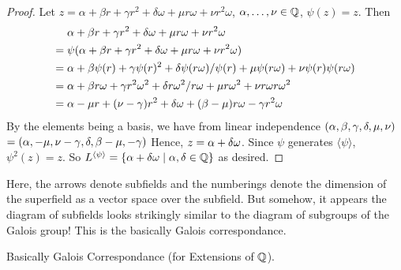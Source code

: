 \documentclass[../book.tex]{subfiles}
\begin{document}
\begin{eg}
\begin{proof}
    Let $z = \alpha + \beta r + \gamma r^2 
    + \delta \omega + \mu r\omega + \nu r^2\omega$, 
    $\alpha, \dots, \nu \in \mathbb{Q}$, $\psi (z) = z$. 
    Then \begin{align*}
        & \alpha + \beta r + \gamma r^2 
        + \delta \omega + \mu r\omega + \nu r^2\omega \\
        =\;&\psi(\alpha + \beta r + \gamma r^2 
        + \delta \omega + \mu r\omega + \nu r^2\omega) \\
        =\;& \alpha + \beta \psi(r) + \gamma \psi(r)^2 + \delta\psi(r\omega)/\psi(r)
        + \mu \psi(r\omega) + \nu \psi(r)\psi(r\omega) \\
        =\;& \alpha + \beta r \omega + \gamma r^2 \omega^2 + \delta r\omega^2 / r\omega
        + \mu r \omega^2 + \nu r\omega r\omega^2 \\
        =\;& \alpha -\mu r + (\nu - \gamma)r^2 + \delta\omega + (\beta - \mu)r\omega - \gamma r^2 \omega
        \end{align*}
    By the elements being a basis, we have from linear independence
    $(\alpha,\beta,\gamma,\delta,\mu,\nu)$ $= (\alpha,-\mu,\nu-\gamma,\delta,\beta-\mu,-\gamma)$  
    Hence, $z = \alpha + \delta\omega$. 
    Since $\psi$ generates $\langle \psi \rangle$, $\psi^2(z) = z$. 
    So $L^{\langle \psi \rangle} = \{ \alpha + \delta\omega \mid \alpha, \delta \in \mathbb{Q}\}$ 
    as desired. 
\end{proof}
\begin{figure}[ht]
    \centering
\end{figure}

Here, the arrows denote subfields and the numberings denote
the dimension of the superfield as a vector space over the subfield. 
But somehow, it appears the diagram of subfields looks strikingly similar to
the diagram of subgroups of the Galois group! 
This is the basically Galois correspondance. 

\begin{thm} Basically Galois Correspondance (for Extensions of $\mathbb{Q}$). 


\end{thm}
\end{eg}
\end{document}
